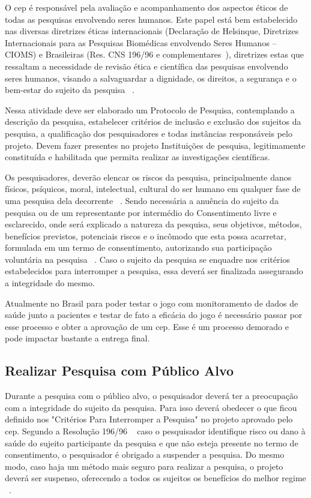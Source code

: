 O \ac{cep} é responsável pela avaliação e acompanhamento dos aspectos éticos de todas as pesquisas envolvendo seres humanos. Este papel está bem estabelecido nas diversas diretrizes éticas internacionais (Declaração de Helsinque, Diretrizes Internacionais para as Pesquisas Biomédicas envolvendo Seres Humanos – CIOMS) e Brasileiras (Res. CNS 196/96 e complementares~\cite{conselho2000normas}), diretrizes estas que ressaltam a necessidade de revisão ética e científica das pesquisas envolvendo seres humanos, visando a salvaguardar a dignidade, os direitos, a segurança e o bem-estar do sujeito da pesquisa ~\cite{conep2002}.

Nessa atividade deve ser elaborado um Protocolo de Pesquisa, contemplando a descrição da pesquisa, estabelecer critérios de inclusão e exclusão dos sujeitos da pesquisa, a qualificação dos pesquisadores e todas instâncias responsáveis pelo projeto. Devem fazer presentes no projeto Instituições de pesquisa, legitimamente constituída e habilitada que permita realizar as investigações científicas. 

Os pesquisadores, deverão elencar os riscos da pesquisa, principalmente danos físicos, psíquicos, moral, intelectual, cultural do ser humano em qualquer fase de uma pesquisa dela decorrente ~\cite{conselho2000normas}. Sendo necessária a anuência do sujeito da pesquisa ou de um representante por intermédio do Consentimento livre e esclarecido, onde será explicado a natureza da pesquisa, seus objetivos, métodos, benefícios previstos, potenciais riscos e o incômodo que esta possa acarretar, formulada em um termo de consentimento, autorizando sua participação voluntária na pesquisa ~\cite{conselho2000normas}. Caso o sujeito da pesquisa se enquadre nos critérios estabelecidos para interromper a pesquisa, essa deverá ser finalizada assegurando a integridade do mesmo.

Atualmente no Brasil para poder testar o jogo com monitoramento de dados de saúde junto a pacientes e testar de fato a eficácia do jogo é necessário passar por esse processo e obter a aprovação de um \ac{cep}. Esse é um processo demorado e pode impactar bastante a entrega final.


\subsection{Realizar Pesquisa com Público Alvo}
Durante a pesquisa com o público alvo, o pesquisador deverá ter a preocupação com a integridade do sujeito da pesquisa.
Para isso deverá obedecer o que ficou definido nos "Critérios Para Interromper a Pesquisa" no projeto aprovado pelo \ac{cep}. Segundo a Resolução 196/96 ~\cite{conselho2000normas} caso o pesquisador identifique risco ou dano à saúde do sujeito participante da pesquisa e que não esteja presente no termo de consentimento, o pesquisador é obrigado a suspender a pesquisa. Do mesmo modo, caso haja um método mais seguro para realizar a pesquisa, o projeto deverá ser suspenso, oferecendo a todos os sujeitos os benefícios do melhor regime ~\cite{conselho2000normas}.

